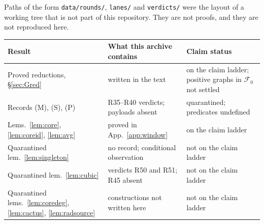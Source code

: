 \documentclass[11pt]{amsart}
\theoremstyle{definition}
\theoremstyle{remark}
\begin{document}
Paths of the form \texttt{data/rounds/}, \texttt{lanes/} and \texttt{verdicts/} were the layout of a working tree that is not part of this repository. They are not proofs, and they are not reproduced here.

\begin{center}\small
\begin{tabular}{@{}p{5.5cm}p{5.3cm}p{3.5cm}@{}}
\toprule
Result & What this archive contains & Claim status\\
\midrule
Proved reductions, \S\ref{sec:Gred} & written in the text & on the claim ladder; positive graphs in $\mathcal F_0$ not settled\\
Records (M), (S), (P) & R35--R40 verdicts; payloads absent & quarantined; predicates undefined\\
Lems.~\ref{lem:core}, \ref{lem:coreid}, \ref{lem:avg} & proved in App.~\ref{app:window} & on the claim ladder\\
Quarantined lem.~\ref{lem:singleton} & no record; conditional observation & not on the claim ladder\\
Quarantined lem.~\ref{lem:cubic} & verdicts R50 and R51; R45 absent & not on the claim ladder\\
Quarantined lems.~\ref{lem:coredeg}, \ref{lem:cactus}, \ref{lem:radsource} & constructions not written here & not on the claim ladder\\
\bottomrule
\end{tabular}
\end{center}
\end{document}
